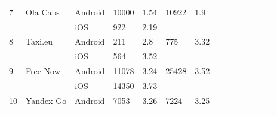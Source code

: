 \documentclass[12pt]{article}
\begin{document}
\begin{table}[!h]
\begin{tabular}{p{0.5cm}lp{1.5cm}lp{2cm}lp{2cm}lp{2cm}lp{2cm}lp{2cm}l}
7           & Ola Cabs          & Android     & 10000                                                                    & 1.54                                                                       & 10922                                                                             & 1.9                                \\
            &                   & iOS         & 922                                                                      & 2.19                                                                       &                                                                                   &                                    \\
8           & Taxi.eu           & Android     & 211                                                                      & 2.8                                                                        & 775                                                                               & 3.32                               \\
            &                   & iOS         & 564                                                                      & 3.52                                                                       &                                                                                   &                                    \\
9           & Free Now          & Android     & 11078                                                                    & 3.24                                                                       & 25428                                                                             & 3.52                               \\
            &                   & iOS         & 14350                                                                    & 3.73                                                                       &                                                                                   &                                    \\
10          & Yandex Go         & Android     & 7053                                                                     & 3.26                                                                       & 7224                                                                              & 3.25                               \\
\hline
\label{tab:total_reviews_rating}
\end{tabular}
\end{table}
\end{document}
